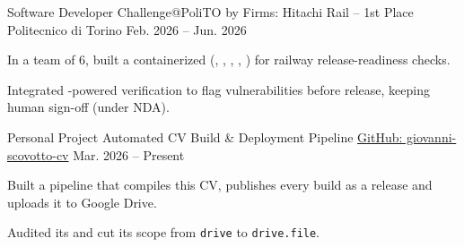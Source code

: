 
\begin{cventries}

  \cventry
    {Software Developer} %
    {Challenge@PoliTO by Firms: Hitachi Rail -- 1st Place} %
    {Politecnico di Torino} %
    {Feb. 2026 -- Jun. 2026} %
    {
      \begin{cvitems} %
        \item {In a team of 6, built a containerized  (, , , , ) for railway release-readiness checks.}
        \item {Integrated -powered verification to flag vulnerabilities before release, keeping human sign-off (under NDA).}
      \end{cvitems}
    }

  \cventry
    {Personal Project} %
    {Automated CV Build \& Deployment Pipeline} %
    {\href{https://github.com/giovanniscovotto/giovanni-scovotto-cv}{GitHub: giovanni-scovotto-cv}} %
    {Mar. 2026 -- Present} %
    {
      \begin{cvitems} %
        \item {Built a  pipeline that compiles this CV, publishes every build as a release and uploads it to Google Drive.}
        \item {Audited its  and cut its scope from \texttt{drive} to \texttt{drive.file}.}
      \end{cvitems}
    }

\end{cventries}
